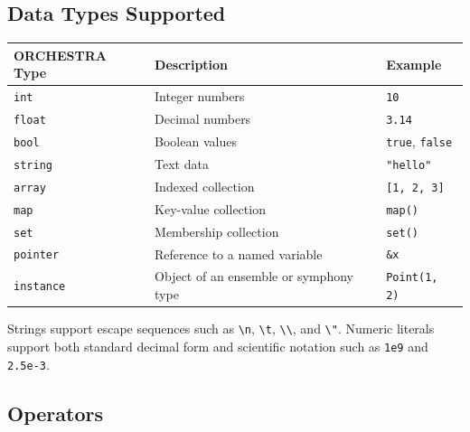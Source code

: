 \documentclass[12pt,a4paper]{article}
\begin{document}
\subsection*{Data Types Supported}

\begin{table}[H]
\centering
\begin{tabularx}{\textwidth}{l X X}
\toprule
\textnormal{ORCHESTRA Type} & \textnormal{Description} & \textnormal{Example} \\
\midrule
\texttt{int} & Integer numbers & \texttt{10} \\
\texttt{float} & Decimal numbers & \texttt{3.14} \\
\texttt{bool} & Boolean values & \texttt{true}, \texttt{false} \\
\texttt{string} & Text data & \texttt{"hello"} \\
\texttt{array} & Indexed collection & \texttt{[1, 2, 3]} \\
\texttt{map} & Key-value collection & \texttt{map()} \\
\texttt{set} & Membership collection & \texttt{set()} \\
\texttt{pointer} & Reference to a named variable & \texttt{\&x} \\
\texttt{instance} & Object of an ensemble or symphony type & \texttt{Point(1, 2)} \\
\bottomrule
\end{tabularx}
\end{table}

Strings support escape sequences such as \texttt{\textbackslash n}, \texttt{\textbackslash t}, \texttt{\textbackslash\textbackslash}, and \texttt{\textbackslash"}. Numeric literals support both standard decimal form and scientific notation such as \texttt{1e9} and \texttt{2.5e-3}.

\subsection*{Operators}
\end{document}
